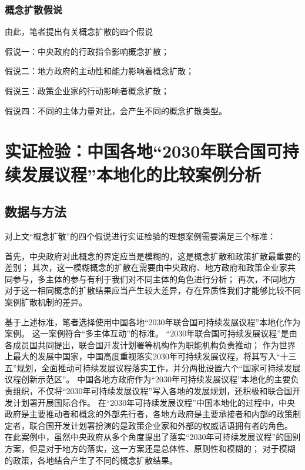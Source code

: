 \documentclass[
  12pt,
]{ctexart}
\begin{document}
\hypertarget{ux6982ux5ff5ux6269ux6563ux5047ux8bf4}{%
\subsubsection{概念扩散假说}\label{ux6982ux5ff5ux6269ux6563ux5047ux8bf4}}

由此，笔者提出有关概念扩散的四个假说

假说一：中央政府的行政指令影响概念扩散；

假说二：地方政府的主动性和能力影响着概念扩散；

假说三：政策企业家的行动影响者概念扩散；

假说四：不同的主体力量对比，会产生不同的概念扩散类型。

\hypertarget{ux5b9eux8bc1ux68c0ux9a8cux4e2dux56fdux5404ux57302030ux5e74ux8054ux5408ux56fdux53efux6301ux7eedux53d1ux5c55ux8baeux7a0bux672cux5730ux5316ux7684ux6bd4ux8f83ux6848ux4f8bux5206ux6790}{%
\section{实证检验：中国各地``2030年联合国可持续发展议程''本地化的比较案例分析}\label{ux5b9eux8bc1ux68c0ux9a8cux4e2dux56fdux5404ux57302030ux5e74ux8054ux5408ux56fdux53efux6301ux7eedux53d1ux5c55ux8baeux7a0bux672cux5730ux5316ux7684ux6bd4ux8f83ux6848ux4f8bux5206ux6790}}

\hypertarget{ux6570ux636eux4e0eux65b9ux6cd5}{%
\subsection{数据与方法}\label{ux6570ux636eux4e0eux65b9ux6cd5}}

对上文``概念扩散''的四个假说进行实证检验的理想案例需要满足三个标准：

首先，中央政府对此概念的界定应当是模糊的，这是概念扩散和政策扩散最重要的差别；
其次，这一模糊概念的扩散在需要由中央政府、地方政府和政策企业家共同参与，多主体的参与有利于我们对不同主体的角色进行分析；
再次，不同地方对于这一相同概念的扩散结果应当产生较大差异，存在异质性我们才能够比较不同案例扩散机制的差异。

基于上述标准，笔者选择使用中国各地``2030年联合国可持续发展议程''本地化作为案例。
这一案例符合``多主体互动''的标准。
``2030年联合国可持续发展议程''是由各成员国共同提出，联合国开发计划署等机构作为职能机构负责推动；
作为世界上最大的发展中国家，中国高度重视落实2030年可持续发展议程，将其写入``十三五''规划，全面推动可持续发展议程落实工作，并分两批设置六个``国家可持续发展议程创新示范区''。
中国各地方政府作为``2030年可持续发展议程''本地化的主要负责组织，不仅将``2030年可持续发展议程''写入各地的发展规划，还积极和联合国开发计划署开展国际合作。
在``2030年可持续发展议程''中国本地化的过程中，中央政府是主要推动者和概念的外部先行者，各地方政府是主要承接者和内部的政策制定者，联合国开发计划署扮演的是政策企业家和外部的权威话语拥有者的角色。
在此案例中，虽然中央政府从多个角度提出了落实``2030年可持续发展议程''的国别方案，但是对于地方的落实，这一方案还是总体性、原则性和模糊的；
对于模糊的政策，各地结合产生了不同的概念扩散结果。
\end{document}
